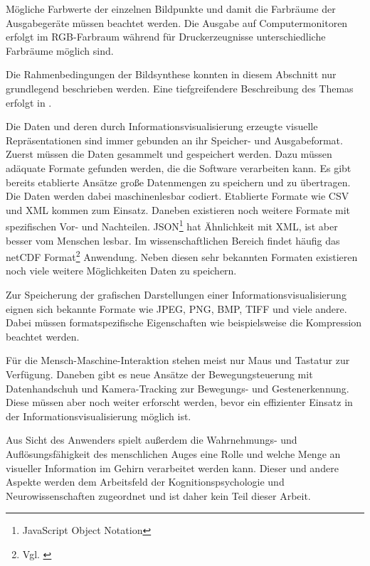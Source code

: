 \documentclass[a4paper, 12pt, DIVcalc, onepage, pdftex, headsepline, footsepline]{scrreprt}
\begin{document}
Mögliche Farbwerte der einzelnen Bildpunkte und damit die Farbräume der Ausgabegeräte
müssen beachtet werden. Die Ausgabe auf Computermonitoren erfolgt im RGB-Farbraum während
für Druckerzeugnisse unterschiedliche Farbräume möglich sind.

Die Rahmenbedingungen der Bildsynthese konnten in diesem Abschnitt nur grundlegend beschrieben
werden. Eine tiefgreifendere Beschreibung des Themas erfolgt in \citep{Computergrafik}.

Die Daten und deren durch Informationsvisualisierung erzeugte visuelle Repräsentationen sind immer
gebunden an ihr Speicher- und Ausgabeformat.
Zuerst müssen die Daten gesammelt und gespeichert werden. Dazu müssen adäquate
Formate gefunden werden, die die Software verarbeiten kann. Es gibt bereits
etablierte Ansätze große Datenmengen zu speichern und zu übertragen. Die Daten
werden dabei maschinenlesbar codiert. Etablierte Formate wie
CSV und XML kommen zum Einsatz. Daneben existieren noch weitere Formate mit spezifischen
Vor- und Nachteilen. JSON\footnote{JavaScript Object Notation} hat Ähnlichkeit mit XML,
ist aber besser vom Menschen lesbar. Im wissenschaftlichen Bereich findet
häufig das netCDF Format\footnote{Vgl. \citep{Schumann}}
Anwendung. Neben diesen sehr bekannten Formaten existieren noch viele weitere
Möglichkeiten Daten zu speichern.

Zur Speicherung der grafischen Darstellungen einer Informationsvisualisierung eignen sich bekannte
Formate wie JPEG, PNG, BMP, TIFF und viele andere. Dabei müssen formatspezifische
Eigenschaften wie beispielsweise die Kompression beachtet werden.

Für die Mensch-Maschine-Interaktion stehen meist nur Maus und Tastatur zur Verfügung.
Daneben gibt es neue Ansätze der Bewegungsteuerung mit Datenhandschuh und
Kamera-Tracking zur Bewegungs- und Gestenerkennung. Diese müssen aber noch weiter
erforscht werden, bevor ein effizienter Einsatz in der Informationsvisualisierung
möglich ist.

Aus Sicht des Anwenders spielt außerdem die Wahrnehmungs- und Auflösungsfähigkeit
des menschlichen Auges eine Rolle und welche Menge an visueller Information
im Gehirn verarbeitet werden kann.
Dieser und andere Aspekte werden dem Arbeitsfeld der Kognitionspsychologie und
Neurowissenschaften zugeordnet und ist daher kein Teil dieser Arbeit.
\end{document}
